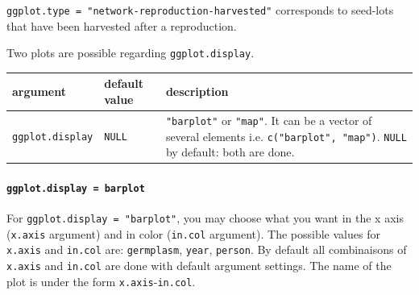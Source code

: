 \documentclass{article}\usepackage[]{graphicx}\usepackage[]{color}
\begin{document}
\texttt{ggplot.type = "network-reproduction-harvested"} corresponds to seed-lots that have been harvested after a reproduction.


Two plots are possible regarding \texttt{ggplot.display}.

\begin{center}
\begin{tabular}{ p{} p{} p{} }
\hline
argument & default value & description \\
\hline
\texttt{ggplot.display} & \texttt{NULL} & \texttt{"barplot"} or  \texttt{"map"}.
It can be a vector of several elements i.e. \texttt{c("barplot", "map")}. 
\texttt{NULL} by default: both are done. \\
\hline
\end{tabular}
\end{center}


\paragraph{\texttt{ggplot.display = barplot}}

For \texttt{ggplot.display = "barplot"}, you may choose what you want in the x axis (\texttt{x.axis} argument) and in color (\texttt{in.col} argument).
The possible values for \texttt{x.axis} and \texttt{in.col} are: \texttt{germplasm}, \texttt{year}, \texttt{person}.
By default all combinaisons of \texttt{x.axis} and \texttt{in.col} are done with default argument settings.
The name of the plot is under the form \texttt{x.axis}-\texttt{in.col}.
\end{document}

